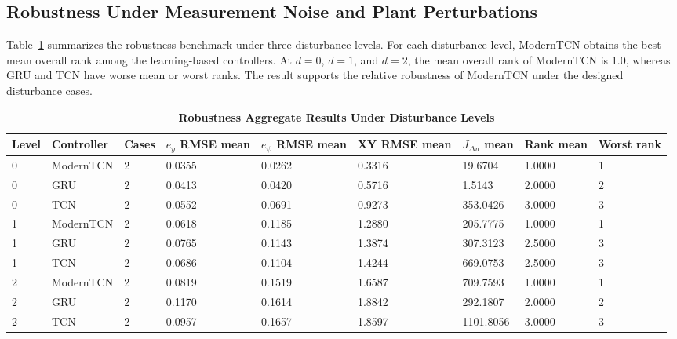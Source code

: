 \documentclass{ieeeaccess}
\begin{document}
\subsection{Robustness Under Measurement Noise and Plant Perturbations}

Table~\ref{tab:robustness_aggregate} summarizes the robustness benchmark under three disturbance levels. For each disturbance level, ModernTCN obtains the best mean overall rank among the learning-based controllers. At $d=0$, $d=1$, and $d=2$, the mean overall rank of ModernTCN is 1.0, whereas GRU and TCN have worse mean or worst ranks. The result supports the relative robustness of ModernTCN under the designed disturbance cases.

\begin{table}[!t]

\caption{\textbf{Robustness Aggregate Results Under Disturbance Levels}}

\label{tab:robustness_aggregate}

\setlength{\tabcolsep}{4pt}

\begin{tabular}{|p{42pt}|p{76pt}|p{42pt}|p{52pt}|p{52pt}|p{52pt}|p{56pt}|p{54pt}|p{48pt}|}

\hline

Level & Controller & Cases & $e_y$ RMSE mean & $e_{\psi}$ RMSE mean & XY RMSE mean & $J_{\Delta u}$ mean & Rank mean & Worst rank \\

\hline

0 & ModernTCN & 2 & 0.0355 & 0.0262 & 0.3316 & 19.6704 & 1.0000 & 1 \\

0 & GRU & 2 & 0.0413 & 0.0420 & 0.5716 & 1.5143 & 2.0000 & 2 \\

0 & TCN & 2 & 0.0552 & 0.0691 & 0.9273 & 353.0426 & 3.0000 & 3 \\

1 & ModernTCN & 2 & 0.0618 & 0.1185 & 1.2880 & 205.7775 & 1.0000 & 1 \\

1 & GRU & 2 & 0.0765 & 0.1143 & 1.3874 & 307.3123 & 2.5000 & 3 \\

1 & TCN & 2 & 0.0686 & 0.1104 & 1.4244 & 669.0753 & 2.5000 & 3 \\

2 & ModernTCN & 2 & 0.0819 & 0.1519 & 1.6587 & 709.7593 & 1.0000 & 1 \\

2 & GRU & 2 & 0.1170 & 0.1614 & 1.8842 & 292.1807 & 2.0000 & 2 \\

2 & TCN & 2 & 0.0957 & 0.1657 & 1.8597 & 1101.8056 & 3.0000 & 3 \\

\hline

\end{tabular}

\end{table}
\end{document}
